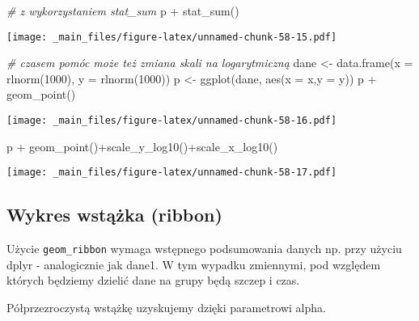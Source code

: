 \documentclass[
]{book}
\newenvironment{Shaded}{\begin{snugshade}}{\end{snugshade}}
\newcommand{\AttributeTok}[1]{\textcolor[rgb]{0.77,0.63,0.00}{#1}}
\newcommand{\CommentTok}[1]{\textcolor[rgb]{0.56,0.35,0.01}{\textit{#1}}}
\newcommand{\DecValTok}[1]{\textcolor[rgb]{0.00,0.00,0.81}{#1}}
\newcommand{\FunctionTok}[1]{\textcolor[rgb]{0.00,0.00,0.00}{#1}}
\newcommand{\NormalTok}[1]{#1}
\newcommand{\OtherTok}[1]{\textcolor[rgb]{0.56,0.35,0.01}{#1}}
\newcommand{\SpecialCharTok}[1]{\textcolor[rgb]{0.00,0.00,0.00}{#1}}
\begin{document}
\begin{Shaded}
\begin{Highlighting}[]
\CommentTok{\# z wykorzystaniem stat\_sum}
\NormalTok{p }\SpecialCharTok{+} \FunctionTok{stat\_sum}\NormalTok{()}
\end{Highlighting}
\end{Shaded}

\texttt{[image: \_main\_files/figure-latex/unnamed-chunk-58-15.pdf]}

\begin{Shaded}
\begin{Highlighting}[]
\CommentTok{\# czasem pomóc może też zmiana skali na logarytmiczną}
\NormalTok{dane }\OtherTok{\textless{}{-}} \FunctionTok{data.frame}\NormalTok{(}\AttributeTok{x =} \FunctionTok{rlnorm}\NormalTok{(}\DecValTok{1000}\NormalTok{), }\AttributeTok{y =} \FunctionTok{rlnorm}\NormalTok{(}\DecValTok{1000}\NormalTok{))}
\NormalTok{p }\OtherTok{\textless{}{-}} \FunctionTok{ggplot}\NormalTok{(dane, }\FunctionTok{aes}\NormalTok{(}\AttributeTok{x =}\NormalTok{ x,}\AttributeTok{y =}\NormalTok{ y))}
\NormalTok{p }\SpecialCharTok{+} \FunctionTok{geom\_point}\NormalTok{()}
\end{Highlighting}
\end{Shaded}

\texttt{[image: \_main\_files/figure-latex/unnamed-chunk-58-16.pdf]}

\begin{Shaded}
\begin{Highlighting}[]
\NormalTok{p }\SpecialCharTok{+} \FunctionTok{geom\_point}\NormalTok{()}\SpecialCharTok{+}\FunctionTok{scale\_y\_log10}\NormalTok{()}\SpecialCharTok{+}\FunctionTok{scale\_x\_log10}\NormalTok{()}
\end{Highlighting}
\end{Shaded}

\texttt{[image: \_main\_files/figure-latex/unnamed-chunk-58-17.pdf]}

\hypertarget{wykres-wstux105ux17cka-ribbon}{%
\subsection{Wykres wstążka (ribbon)}\label{wykres-wstux105ux17cka-ribbon}}

Użycie \texttt{geom\_ribbon} wymaga wstępnego podsumowania danych np. przy użyciu dplyr - analogicznie jak dane1. W tym wypadku zmiennymi, pod względem których będziemy dzielić dane na grupy będą szczep i czas.

Półprzezroczystą wstążkę uzyskujemy dzięki parametrowi alpha.
\end{document}
